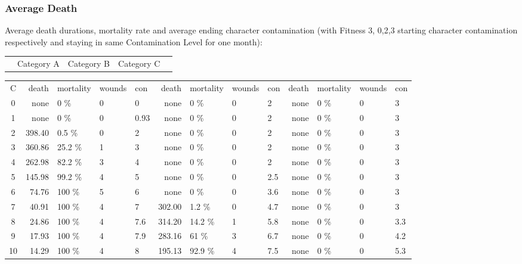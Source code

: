     \subsubsection{Average Death}
    Average death durations, mortality rate and average ending character contamination
    (with Fitness 3, 0,2,3 starting character contamination respectively and staying in same Contamination
    Level for one month):\par\vspace{0.5cm}
    \begin{tabular*}{20cm}{c @{\extracolsep{\fill}}cccc}
        &Category A & Category B & Category C&
    \end{tabular*}\par
    \fontsize{10}{0}
     \begin{tabular}{c|rlll|rlll|rlll}
C & death & mortality & wounds & con & death & mortality & wounds & con &death & mortality & wounds & con\\
0  &none   	&0    \% &     0 &     0 &none   	&0    \% &     0 &     2 &none   	&0    \% &     0 &     3\\
1  &none   	&0    \% &     0 &  0.93 &none   	&0    \% &     0 &     2 &none   	&0    \% &     0 &     3\\
2  &398.40 	&0.5  \% &     0 &     2 &none   	&0    \% &     0 &     2 &none   	&0    \% &     0 &     3\\
3  &360.86 	&25.2 \% &     1 &     3 &none   	&0    \% &     0 &     2 &none   	&0    \% &     0 &     3\\
4  &262.98 	&82.2 \% &     3 &     4 &none   	&0    \% &     0 &     2 &none   	&0    \% &     0 &     3\\
5  &145.98 	&99.2 \% &     4 &     5 &none   	&0    \% &     0 &   2.5 &none   	&0    \% &     0 &     3\\
6  & 74.76 	&100  \% &     5 &     6 &none   	&0    \% &     0 &   3.6 &none   	&0    \% &     0 &     3\\
7  & 40.91 	&100  \% &     4 &     7 &302.00 	&1.2  \% &     0 &   4.7 &none   	&0    \% &     0 &     3\\
8  & 24.86 	&100  \% &     4 &   7.6 &314.20 	&14.2 \% &     1 &   5.8 &none   	&0    \% &     0 &   3.3\\
9  & 17.93 	&100  \% &     4 &   7.9 &283.16 	&61   \% &     3 &   6.7 &none   	&0    \% &     0 &   4.2\\
10 & 14.29 	&100  \% &     4 &     8 &195.13 	&92.9 \% &     4 &   7.5 &none   	&0    \% &     0 &   5.3\\

\end{tabular}
